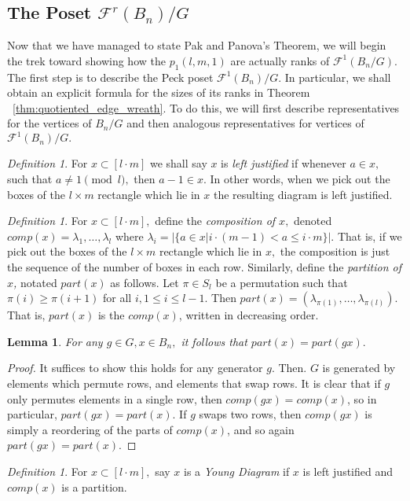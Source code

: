 \documentclass{amsart}
\newtheorem{lem}[thm]{Lemma}
\theoremstyle{remark}
\newtheorem{defn}[thm]{Definition}
\newcommand\ssec{\subsection}
\begin{document}
\ssec{The Poset $\mathcal F^r(B_n)/G$}
Now that we have managed to state Pak and Panova's Theorem, we will begin the trek toward showing how the $p_1(l,m,1)$ are actually ranks of $\mathcal F^1(B_n/G).$ The first step is to describe the Peck poset $\mathcal F^1(B_n)/G.$ In particular, we shall obtain an explicit formula for the sizes of its ranks in Theorem ~\ref{thm:quotiented_edge_wreath}. To do this, we will first describe representatives for the vertices of $B_n/G$ and then analogous representatives for vertices of $\mathcal F^1(B_n)/G.$

\begin{defn}
For $x \subset [l \cdot m]$ we shall say $x$ is {\it left justified} if whenever $a \in x,$ such that $a \neq 1 \pmod l,$ then $a -1 \in x.$ In other words, when we pick out the boxes of the $l\times m$ rectangle which lie in $x$ the resulting diagram is left justified.
\end{defn}

\begin{defn}
For $x \subset [l\cdot m],$ define the {\it composition of $x,$} denoted $comp(x) = \lambda_1 ,\ldots, \lambda_l$ where $\lambda_i = |\{a \in x|i\cdot (m-1)< a \leq i \cdot m\}|.$ That is, if we pick out the boxes of the $l \times m$ rectangle which lie in $x,$ the composition is just the sequence of the number of boxes in each row. Similarly, define the {\it partition of $x$,} notated $part(x)$ as follows. Let $\pi \in S_l$ be a permutation such that $\pi(i) \geq \pi(i+1)$ for all $i,1\leq i \leq l-1.$ Then  $part(x) = (\lambda_{\pi(1)},\ldots, \lambda_{\pi(l)}).$ That is, $part(x)$ is the $comp(x)$, written in decreasing order.
\end{defn}

\begin{lem}
\label{lem:comp_invariance}
For any $g \in G, x \in B_n,$ it follows that $part(x) = part(gx).$
\end{lem}
\begin{proof}
It suffices to show this holds for any generator $g.$ Then. $G$ is generated by elements which permute rows, and elements that swap rows. It is clear that if $g$ only permutes elements in a single row, then $comp(gx) = comp(x)$, so in particular, $part(gx) = part(x).$ If $g$ swaps two rows, then $comp(gx)$ is simply a reordering of the parts of $comp(x)$, and so again $part(gx) = part(x).$
\end{proof}

\begin{defn}
For $x \subset [l\cdot m],$ say $x$ is a {\it Young Diagram} if $x$ is left justified and $comp(x)$ is a partition.
\end{defn}
\end{document}
